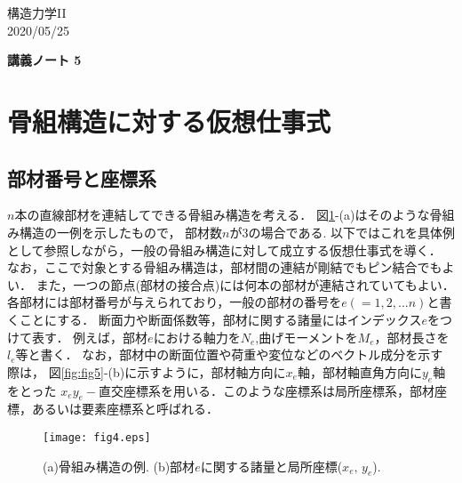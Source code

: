 \documentclass[10pt,a4j]{jarticle}
\newlength{\minitwocolumn}
\begin{document}
\newcommand{\fat}[1]{\mbox{\boldmath $#1$}}
\newcommand{\D}{\partial}
\newcommand{\w}{\omega}
\newcommand{\ga}{\alpha}
\newcommand{\gb}{\beta}
\newcommand{\gx}{\xi}
\newcommand{\gz}{\zeta}
\newcommand{\vhat}[1]{\hat{\fat{#1}}}
\newcommand{\spc}{\vspace{0.7\baselineskip}}
\newcommand{\halfspc}{\vspace{0.3\baselineskip}}

\newcommand{\twofig}[2]
 {
   \begin{figure}
     \begin{minipage}[t]{\minitwocolumn}
         \begin{center}   #1
         \end{center}
     \end{minipage}
         \hspace{\columnsep}
     \begin{minipage}[t]{\minitwocolumn}
         \begin{center} #2
         \end{center}
     \end{minipage}
   \end{figure}
 }
\begin{flushright}
	構造力学II\\
	2020/05/25
\end{flushright}
\begin{center}
	{\LARGE \bf 講義ノート 5} \\
\end{center}
\setcounter{section}{4}
\section{骨組構造に対する仮想仕事式}
\subsection{部材番号と座標系}
$n$本の直線部材を連結してできる骨組み構造を考える．
図\ref{fig:fig4}-(a)はそのような骨組み構造の一例を示したもので，
部材数$n$が3の場合である. 
以下ではこれを具体例として参照しながら，一般の骨組み構造に対して成立する仮想仕事式を導く．
なお，ここで対象とする骨組み構造は，部材間の連結が剛結でもピン結合でもよい．
また，一つの節点(部材の接合点)には何本の部材が連結されていてもよい．
各部材には部材番号が与えられており，一般の部材の番号を$e(=1,2,\dots n)$と書くことにする．
断面力や断面係数等，部材に関する諸量にはインデックス$e$をつけて表す．
例えば，部材$e$における軸力を$N_e$,曲げモーメントを$M_e$，部材長さを$l_e$等と書く．
なお，部材中の断面位置や荷重や変位などのベクトル成分を示す際は，
図\ref{fig:fig5}-(b)に示すように，部材軸方向に$x_e$軸，部材軸直角方向に$y_e$軸をとった
$x_ey_e-$直交座標系を用いる．このような座標系は局所座標系，部材座標，あるいは要素座標系と呼ばれる．
\begin{figure}[h]
	\begin{center}
	\texttt{[image: fig4.eps]} 
	\end{center}
	\caption{(a)骨組み構造の例. 
	 (b)部材$e$に関する諸量と局所座標($x_e,\,y_e$).} 
	\label{fig:fig4}
\end{figure}
\end{document}
